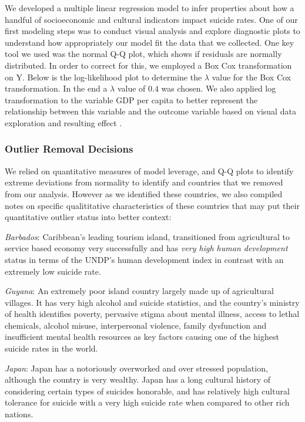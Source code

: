 \documentclass[]{article}
\begin{document}
We developed a multiple linear regression model to infer properties
about how a handful of socioeconomic and cultural indicators impact
suicide rates. One of our first modeling steps was to conduct visual
analysis and explore diagnostic plots to understand how appropriately
our model fit the data that we collected. One key tool we used was the
normal Q-Q plot, which shows if residuals are normally distributed. In
order to correct for this, we employed a Box Cox transformation on Y.
Below is the log-likelihood plot to determine the \(\lambda\) value for
the Box Cox transformation. In the end a \(\lambda\) value of \(0.4\)
was chosen. We also applied log transformation to the variable GDP per
capita to better represent the relationship between this variable and
the outcome variable based on visual data exploration and resulting
effect .

\subsubsection{Outlier Removal
Decisions}\label{outlier-removal-decisions}

We relied on quantitative measures of model leverage, and Q-Q plots to
identify extreme deviations from normality to identify and countries
that we removed from our analysis. However as we identified these
countries, we also compiled notes on specific qualititative
characteristics of these countries that may put their quantitative
outlier status into better context:

\emph{Barbados}: Caribbean's leading tourism island, transitioned from
agricultural to service based economy very successfully and has
\emph{very high human development} status in terms of the UNDP's human
development index in contrast with an extremely low suicide rate.

\emph{Guyana}: An extremely poor island country largely made up of
agricultural villages. It has very high alcohol and suicide statistics,
and the country's ministry of health identifies poverty, pervasive
stigma about mental illness, access to lethal chemicals, alcohol misuse,
interpersonal violence, family dysfunction and insufficient mental
health resources as key factors causing one of the highest suicide rates
in the world.

\emph{Japan}: Japan has a notoriously overworked and over stressed
population, although the country is very wealthy. Japan has a long
cultural history of considering certain types of suicides honorable, and
has relatively high cultural tolerance for suicide with a very high
suicide rate when compared to other rich nations.
\end{document}
